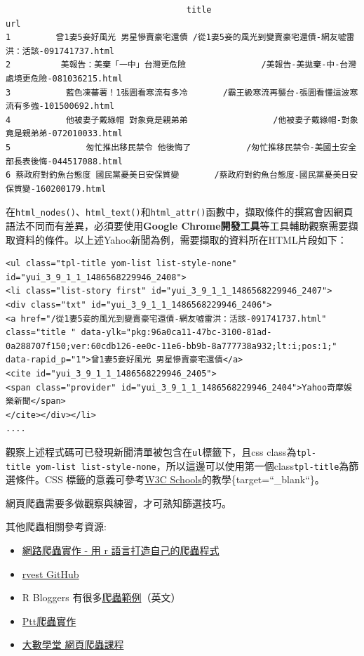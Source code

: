 \documentclass[]{book}
\providecommand{\tightlist}{%
  \setlength{\itemsep}{0pt}\setlength{\parskip}{0pt}}
\theoremstyle{definition}
\theoremstyle{definition}
\theoremstyle{remark}
\begin{document}
\begin{verbatim}
                                    title                                                           url
1         曾1妻5妾好風光 男星慘賣豪宅還債 /從1妻5妾的風光到變賣豪宅還債-網友噓雷洪：活該-091741737.html
2          美報告：美棄「一中」台灣更危險               /美報告-美拋棄-中-台灣處境更危險-081036215.html
3           藍色凍蕃薯！1張圖看寒流有多冷       /霸王級寒流再襲台-張圖看懂這波寒流有多強-101500692.html
4           他被妻子戴綠帽 對象竟是親弟弟                 /他被妻子戴綠帽-對象竟是親弟弟-072010033.html
5               匆忙推出移民禁令 他後悔了           /匆忙推移民禁令-美國土安全部長表後悔-044517088.html
6 蔡政府對釣魚台態度 國民黨憂美日安保質變       /蔡政府對釣魚台態度-國民黨憂美日安保質變-160200179.html
\end{verbatim}

在\texttt{html\_nodes()}、\texttt{html\_text()}和\texttt{html\_attr()}函數中，擷取條件的撰寫會因網頁語法不同而有差異，必須要使用\textbf{Google
Chrome開發工具}等工具輔助觀察需要擷取資料的條件。以上述Yahoo新聞為例，需要擷取的資料所在HTML片段如下：

\begin{verbatim}
<ul class="tpl-title yom-list list-style-none" id="yui_3_9_1_1_1486568229946_2408">
<li class="list-story first" id="yui_3_9_1_1_1486568229946_2407">
<div class="txt" id="yui_3_9_1_1_1486568229946_2406">
<a href="/從1妻5妾的風光到變賣豪宅還債-網友噓雷洪：活該-091741737.html" class="title " data-ylk="pkg:96a0ca11-47bc-3100-81ad-0a288707f150;ver:60cdb126-ee0c-11e6-bb9b-8a777738a932;lt:i;pos:1;" data-rapid_p="1">曾1妻5妾好風光 男星慘賣豪宅還債</a>
<cite id="yui_3_9_1_1_1486568229946_2405">
<span class="provider" id="yui_3_9_1_1_1486568229946_2404">Yahoo奇摩娛樂新聞</span>
</cite></div></li>
....
\end{verbatim}

觀察上述程式碼可已發現新聞清單被包含在\texttt{ul}標籤下，且css
class為\texttt{tpl-title\ yom-list\ list-style-none}，所以這邊可以使用第一個class\texttt{tpl-title}為篩選條件。CSS
標籤的意義可參考\href{https://www.w3schools.com/cssref/css_selectors.asp}{W3C
Schools}的教學\{target=``\_blank``\}。

網頁爬蟲需要多做觀察與練習，才可熟知篩選技巧。

其他爬蟲相關參考資源:

\begin{itemize}
\tightlist
\item
  \href{https://www.slideshare.net/secret/mdfHLPgvIW1kPR}{網路爬蟲實作 -
  用 r 語言打造自己的爬蟲程式}
\item
  \href{https://github.com/hadley/rvest}{rvest GitHub}
\item
  R Bloggers
  有很多\href{http://www.r-bloggers.com/?s=Web+Scraping}{爬蟲範例}（英文）
\item
  \href{http://bryannotes.blogspot.tw/2014/08/r-ptt-wantedsocial-network-analysis.html}{Ptt爬蟲實作}
\item
  \href{http://www.largitdata.com/course_list/1}{大數學堂 網頁爬蟲課程}
\end{itemize}
\end{document}
